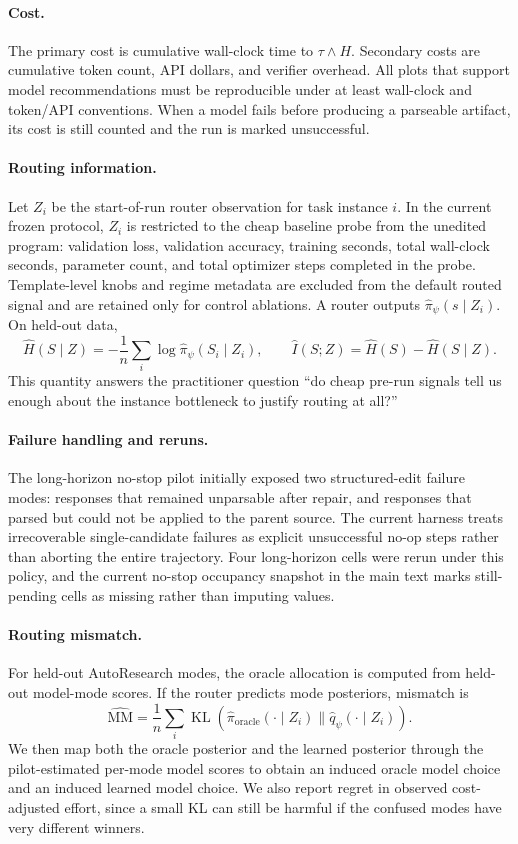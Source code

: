 \documentclass{article}
\DeclareMathOperator{\KL}{KL}
\begin{document}
\paragraph{Cost.}
The primary cost is cumulative wall-clock time to $\tau\wedge H$.
Secondary costs are cumulative token count, API dollars, and verifier overhead.
All plots that support model recommendations must be reproducible under at least wall-clock and token/API conventions.
When a model fails before producing a parseable artifact, its cost is still counted and the run is marked unsuccessful.

\paragraph{Routing information.}
Let $Z_i$ be the start-of-run router observation for task instance $i$.
In the current frozen protocol, $Z_i$ is restricted to the cheap baseline probe from the unedited program: validation loss, validation accuracy, training seconds, total wall-clock seconds, parameter count, and total optimizer steps completed in the probe.
Template-level knobs and regime metadata are excluded from the default routed signal and are retained only for control ablations.
A router outputs $\hat\pi_\psi(s\mid Z_i)$.
On held-out data,
\[
  \widehat{H}(S\mid Z)
  =
  -\frac{1}{n}\sum_i \log \hat\pi_\psi(S_i\mid Z_i),
  \qquad
  \hat I(S;Z)=\hat H(S)-\widehat{H}(S\mid Z).
\]
This quantity answers the practitioner question ``do cheap pre-run signals tell us enough about the instance bottleneck to justify routing at all?''

\paragraph{Failure handling and reruns.}
The long-horizon no-stop pilot initially exposed two structured-edit failure modes: responses that remained unparsable after repair, and responses that parsed but could not be applied to the parent source.
The current harness treats irrecoverable single-candidate failures as explicit unsuccessful no-op steps rather than aborting the entire trajectory.
Four long-horizon cells were rerun under this policy, and the current no-stop occupancy snapshot in the main text marks still-pending cells as missing rather than imputing values.

\paragraph{Routing mismatch.}
For held-out AutoResearch modes, the oracle allocation is computed from held-out model-mode scores.
If the router predicts mode posteriors, mismatch is
\[
  \widehat{\mathrm{MM}}
  =
  \frac{1}{n}\sum_i \KL(\hat\pi_{\mathrm{oracle}}(\cdot\mid Z_i)\|
  \hat q_\psi(\cdot\mid Z_i)).
\]
We then map both the oracle posterior and the learned posterior through the pilot-estimated per-mode model scores to obtain an induced oracle model choice and an induced learned model choice.
We also report regret in observed cost-adjusted effort, since a small KL can still be harmful if the confused modes have very different winners.
\end{document}
